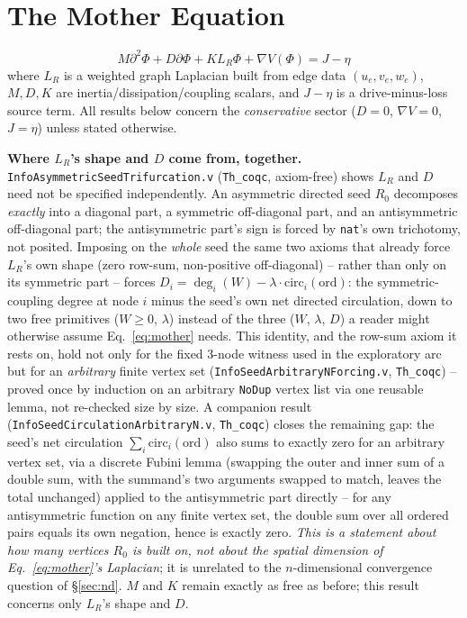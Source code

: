 \documentclass[10pt,twocolumn]{article}
\begin{document}
\section{The Mother Equation}
\label{sec:mother}
\begin{equation}
M\partial^2\Phi + D\partial\Phi + K L_R\Phi + \nabla V(\Phi) = J - \eta
\label{eq:mother}
\end{equation}
where $L_R$ is a weighted graph Laplacian built from edge data
$(u_e, v_e, w_e)$, $M,D,K$ are inertia/dissipation/coupling scalars, and $J-\eta$ is a
drive-minus-loss source term. All results below concern the \emph{conservative}
sector ($D=0$, $\nabla V=0$, $J=\eta$) unless stated otherwise.

\textbf{Where $L_R$'s shape and $D$ come from, together.} \texttt{InfoAsymmetricSeedTrifurcation.v}
(\texttt{Th\_coqc}, axiom-free) shows $L_R$ and $D$ need not be specified independently. An
asymmetric directed seed $R_0$ decomposes \emph{exactly} into a diagonal part, a symmetric
off-diagonal part, and an antisymmetric off-diagonal part; the antisymmetric part's sign is
forced by \texttt{nat}'s own trichotomy, not posited. Imposing on the \emph{whole} seed the same
two axioms that already force $L_R$'s own shape (zero row-sum, non-positive off-diagonal) --
rather than only on its symmetric part -- forces
$D_i = \deg_i(W) - \lambda\cdot\mathrm{circ}_i(\mathrm{ord})$: the symmetric-coupling degree at
node $i$ minus the seed's own net directed circulation, down to two free primitives ($W\geq0$,
$\lambda$) instead of the three ($W$, $\lambda$, $D$) a reader might otherwise assume Eq.~\ref{eq:mother}
needs. This identity, and the row-sum axiom it rests on, hold not only for the fixed 3-node witness
used in the exploratory arc but for an \emph{arbitrary} finite vertex set
(\texttt{InfoSeedArbitraryNForcing.v}, \texttt{Th\_coqc}) -- proved once by induction on an arbitrary
\texttt{NoDup} vertex list via one reusable lemma, not re-checked size by size. A companion result
(\texttt{InfoSeedCirculationArbitraryN.v}, \texttt{Th\_coqc}) closes the remaining gap: the seed's net
circulation $\sum_i\mathrm{circ}_i(\mathrm{ord})$ also sums to exactly zero for an arbitrary vertex
set, via a discrete Fubini lemma (swapping the outer and inner sum of a double sum, with the summand's
two arguments swapped to match, leaves the total unchanged) applied to the antisymmetric part directly
-- for any antisymmetric function on any finite vertex set, the double sum over all ordered pairs
equals its own negation, hence is exactly zero. \emph{This is a statement about how many vertices $R_0$
is built on, not about the spatial dimension of Eq.~\ref{eq:mother}'s Laplacian}; it is unrelated to the
$n$-dimensional convergence question of \S\ref{sec:nd}. $M$ and $K$ remain exactly as free as before;
this result concerns only $L_R$'s shape and $D$.
\end{document}
